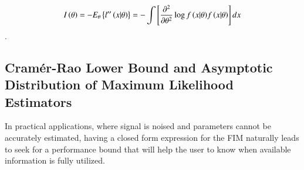 \begin{equation}
\label{eq_prlm_Ifin}
    I\left({\theta}\right) = -E_{\theta}\left\{{l^{\prime\prime}\left({x|\theta}\right)}\right\}=-\int{\left[{\frac{\partial^{2}}{\partial\theta^{2}}\log{f\left({x|\theta}\right)}f\left({x|\theta}\right)}\right]dx}
\end{equation}.
\subsection{Cram\'er-Rao Lower Bound and Asymptotic Distribution of Maximum Likelihood Estimators}
In practical applications, where signal is noised and parameters cannot be accurately estimated, having a closed form expression for the FIM naturally leads to seek for a performance bound that will help the user to know when available information is fully utilized.
